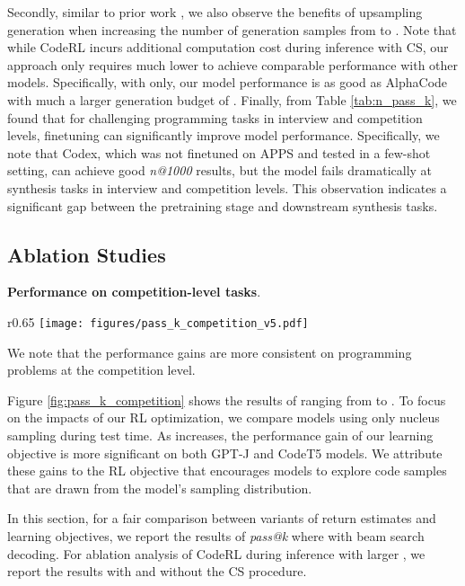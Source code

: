 \documentclass{article}
\begin{document}
Secondly, similar to prior work \cite{hendrycksapps2021, austin2021program, chen2021evaluating}, we also observe the benefits of upsampling generation when increasing the number of generation samples  from  to .  
Note that while CodeRL incurs additional computation cost during inference with CS, our approach only requires much lower  to achieve comparable performance with other models. 
Specifically, with  only, our model performance is as good as AlphaCode with much a larger generation budget of .
Finally, from Table \ref{tab:n_pass_k}, we found that for challenging programming tasks in interview and competition levels, finetuning can significantly improve model performance. 
Specifically, we note that Codex, which was not finetuned on APPS and tested in a few-shot setting, can achieve good \emph{n@1000} results, but the model fails dramatically at synthesis tasks in interview and competition levels.
This observation indicates a significant gap between the pretraining stage and downstream synthesis tasks. 

\subsection{Ablation Studies}



\textbf{Performance on competition-level tasks}.

\newlength{\oldintextsep}
\setlength{\oldintextsep}{\intextsep}
\setlength\intextsep{0pt}
\begin{wrapfigure}{r}{0.65\textwidth}
\centering
    \texttt{[image: figures/pass\_k\_competition\_v5.pdf]}
\caption{Results on APPS competition-level test samples}
  \label{fig:pass_k_competition}
\end{wrapfigure}


We note that the performance gains are more consistent on programming problems at the competition level.

Figure \ref{fig:pass_k_competition} shows the results of  ranging from  to . 
To focus on the impacts of our RL optimization, we compare models using only nucleus sampling during test time. 
As  increases, the performance gain of our learning objective is more significant on both GPT-J and CodeT5 models.
We attribute these gains to the RL objective that encourages models to explore code samples that are drawn from the model's sampling distribution. 


\fi

In this section, for a fair comparison between variants of return estimates and learning objectives, we report the results of \emph{pass@k} where  with beam search decoding.
For ablation analysis of CodeRL during inference with larger , we report the results with and without the CS procedure. 
\end{document}

